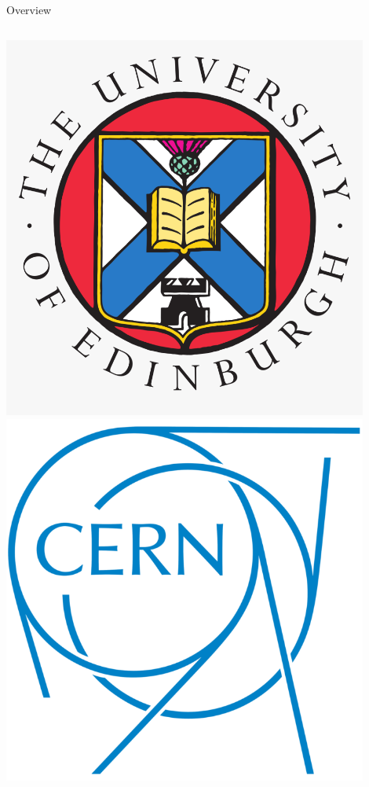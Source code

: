 \documentclass[10pt]{beamer}
\begin{document}
\begin{frame}{Overview}
\begin{columns}
        \begin{columns}
            \includegraphics[width=0.9\textwidth]{uoe-logo}\\
            \vspace{0.5cm}
            \includegraphics[width=0.9\textwidth]{cern-logo}

\end{columns}
\end{columns}
\end{frame}
\end{document}
